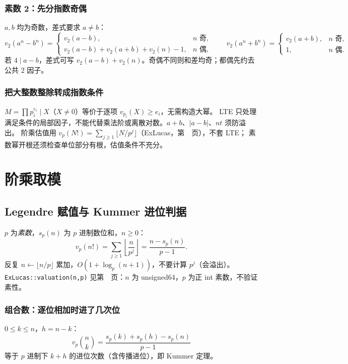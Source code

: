 \subsubsection{素数 2：先分指数奇偶}
$a,b$ 均为奇数，差式要求 $a\ne b$：
\[
v_2(a^n-b^n)=
\begin{cases}
v_2(a-b),&n\text{ 奇},\\
v_2(a-b)+v_2(a+b)+v_2(n)-1,&n\text{ 偶},
\end{cases}\qquad
v_2(a^n+b^n)=
\begin{cases}
v_2(a+b),&n\text{ 奇},\\
1,&n\text{ 偶}.
\end{cases}
\]
若 $4\mid a-b$，差式可写 $v_2(a-b)+v_2(n)$。奇偶不同则和差均奇；都偶先约去公共 2 因子。

\subsubsection{把大整数整除转成指数条件}
$M=\prod p_i^{e_i}\mid X$（$X\ne0$）等价于逐项 $v_{p_i}(X)\ge e_i$，无需构造大幂。
LTE 只处理满足条件的局部因子，不能代替乘法阶或离散对数。$a+b$、$|a-b|$、$nt$ 须防溢出。
阶乘估值用 $v_p(N!)=\sum_{j\ge1}\lfloor N/p^j\rfloor$（ExLucas，第~\pageref{compact-ExLucas}~页），不套 LTE；
素数幂开根还须检查单位部分有根，估值条件不充分。


\newpage

\section{阶乘取模}

\subsection{Legendre 赋值与 Kummer 进位判据}\label{knowledge-valuations}
$p$ 为\emph{素数}，$s_p(n)$ 为 $p$ 进制数位和，$n\ge0$：
\[
 v_p(n!)=\sum_{j\ge1}\left\lfloor\frac n{p^j}\right\rfloor
        =\frac{n-s_p(n)}{p-1}.
\]
反复 $n\gets\lfloor n/p\rfloor$ 累加，$O(1+\log_p(n+1))$，不要计算 $p^j$（会溢出）。
\texttt{ExLucas::valuation(n,p)} 见第~\pageref{compact-ExLucas}~页：$n$ 为 unsigned64，$p$ 为正 int 素数，不验证素性。

\subsubsection{组合数：逐位相加时进了几次位}
$0\le k\le n$，$h=n-k$：
\[
 v_p\binom nk=\frac{s_p(k)+s_p(h)-s_p(n)}{p-1}
\]
等于 $p$ 进制下 $k+h$ 的进位次数（含传播进位），即 Kummer 定理。

